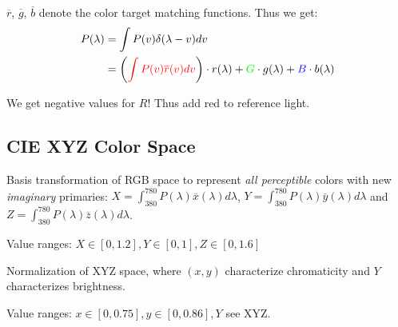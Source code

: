 \(\overline{r}\), \(\overline{g}\), \(\overline{b}\) denote the color target matching functions. Thus we get:
\begin{align*}
  P(\lambda) &= \int P(v)\delta(\lambda - v)dv \\
  &= \left({\color{red}\int P(v)\overline{r}(v)dv}\right)\cdot r(\lambda) + {\color{green}G} \cdot g(\lambda) + {\color{blue}B} \cdot b(\lambda)
\end{align*}

We get negative values for \(R\)! Thus add red to reference light.

\subsection{CIE XYZ Color Space}
Basis transformation of RGB space to represent \textit{all perceptible} colors with new \textit{imaginary} primaries:
\(X = \int_{380}^{780} P(\lambda)\overline{x}(\lambda) d\lambda\), \(Y = \int_{380}^{780} P(\lambda)\overline{y}(\lambda) d\lambda\) and \(Z = \int_{380}^{780} P(\lambda)\overline{z}(\lambda) d\lambda\).

\begin{theorem}
  Value ranges: \(X \in [0, 1.2], Y \in [0, 1], Z \in [0, 1.6]\)
\end{theorem}

\begin{definition}
  Normalization of XYZ space, where \((x, y)\) characterize chromaticity and \(Y\) characterizes brightness.
\end{definition}

\begin{theorem}
  Value ranges: \(x \in [0, 0.75], y \in [0, 0.86], Y\) see XYZ.
\end{theorem}


